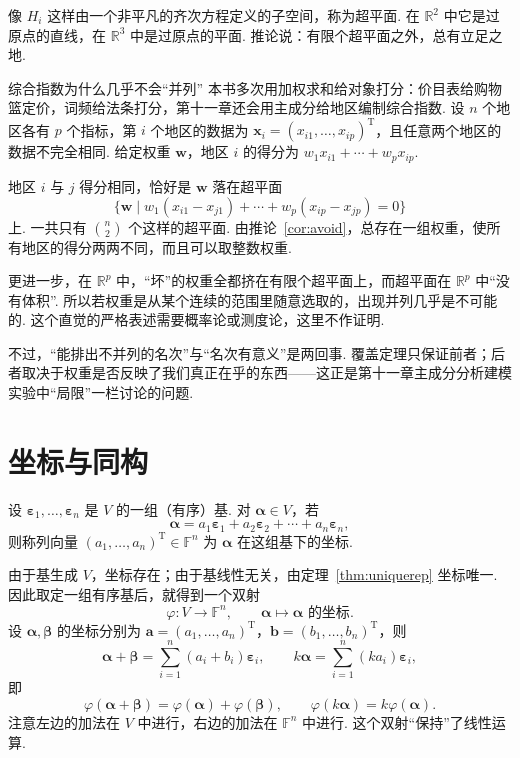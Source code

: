 \documentclass[lang=cn,10.5pt,scheme=chinese,toc=twocol,section,chinesefont=nofont,
twoside,citestyle=gb7714-2015,bibstyle=gb7714-2015]{elegantbook}
\DeclareRobustCommand{\textbf}[1]{{\lnsemiboldlatin\lnsemiboldcjk #1}}
\newcommand{\vv}[1]{\boldsymbol{#1}}
\newcommand{\trans}{\mathrm{T}}             %
\numberwithin{equation}{section}   %
\begin{document}
像 $H_i$ 这样由一个非平凡的齐次方程定义的子空间，称为\textbf{超平面}. 在 $\mathbb{R}^2$ 中它是过原点的直线，在 $\mathbb{R}^3$ 中是过原点的平面. 推论说：有限个超平面之外，总有立足之地.

\begin{linkbox}{综合指数为什么几乎不会“并列”}
  本书多次用加权求和给对象打分：价目表给购物篮定价，词频给法条打分，第十一章还会用主成分给地区编制综合指数. 设 $n$ 个地区各有 $p$ 个指标，第 $i$ 个地区的数据为 $\vv x_i=(x_{i1},\ldots,x_{ip})^\trans$，且任意两个地区的数据不完全相同. 给定权重 $\vv w$，地区 $i$ 的得分为 $w_1x_{i1}+\cdots+w_px_{ip}$.

  地区 $i$ 与 $j$ 得分相同，恰好是 $\vv w$ 落在超平面
  \[\{\vv w\mid w_1(x_{i1}-x_{j1})+\cdots+w_p(x_{ip}-x_{jp})=0\}\]
  上. 一共只有 $\binom n2$ 个这样的超平面. 由推论~\ref{cor:avoid}，\textbf{总存在一组权重，使所有地区的得分两两不同}，而且可以取整数权重.

  更进一步，在 $\mathbb{R}^p$ 中，“坏”的权重全都挤在有限个超平面上，而超平面在 $\mathbb{R}^p$ 中“没有体积”. 所以若权重是从某个连续的范围里随意选取的，出现并列几乎是不可能的. 这个直觉的严格表述需要概率论或测度论，这里不作证明.

  不过，“能排出不并列的名次”与“名次有意义”是两回事. 覆盖定理只保证前者；后者取决于权重是否反映了我们真正在乎的东西——这正是第十一章主成分分析建模实验中“局限”一栏讨论的问题.
\end{linkbox}

\section{坐标与同构}\label{sec:coord}

\begin{definition}
  设 $\vv\varepsilon_1,\ldots,\vv\varepsilon_n$ 是 $V$ 的一组（有序）基. 对 $\vv\alpha\in V$，若
  \[\vv{\alpha}=a_1\vv{\varepsilon}_1+a_2 \vv{\varepsilon}_2+\cdots+a_n\vv{\varepsilon}_n,\]
  则称列向量 $(a_1,\ldots,a_n)^\trans\in\mathbb{F}^n$ 为 $\vv\alpha$ 在这组基下的\textbf{坐标}.
\end{definition}

由于基生成 $V$，坐标存在；由于基线性无关，由定理~\ref{thm:uniquerep} 坐标唯一. 因此取定一组有序基后，就得到一个双射
\[
  \varphi: V\to\mathbb{F}^n,\qquad \vv\alpha\mapsto \vv\alpha\text{ 的坐标}.
\]
设 $\vv\alpha,\vv\beta$ 的坐标分别为 $\vv a=(a_1,\ldots,a_n)^\trans$，$\vv b=(b_1,\ldots,b_n)^\trans$，则
\[
  \vv\alpha+\vv\beta=\sum_{i=1}^n(a_i+b_i)\vv\varepsilon_i,\qquad k\vv\alpha=\sum_{i=1}^n(ka_i)\vv\varepsilon_i,
\]
即
\[
  \varphi(\vv{\alpha}+\vv{\beta})=\varphi(\vv{\alpha})+\varphi(\vv{\beta}),\qquad\varphi(k\vv{\alpha})=k\varphi(\vv{\alpha}).
\]
注意左边的加法在 $V$ 中进行，右边的加法在 $\mathbb{F}^n$ 中进行. 这个双射“保持”了线性运算.
\end{document}
